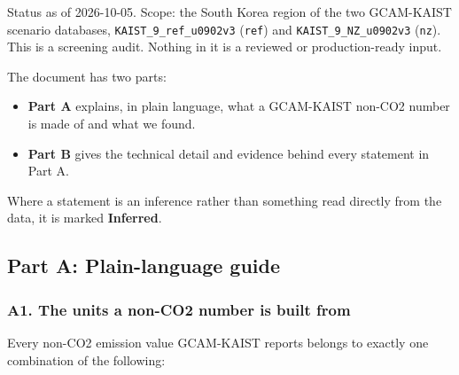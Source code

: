 Status as
of
2026-10-05.
Scope: the
South
Korea
region of
the two
GCAM-KAIST
scenario
databases,
\texttt{KAIST\_\allowbreak{}9\_\allowbreak{}ref\_\allowbreak{}u0902v3}
(\texttt{ref})
and
\texttt{KAIST\_\allowbreak{}9\_\allowbreak{}NZ\_\allowbreak{}u0902v3}
(\texttt{nz}).
This is a
screening
audit.
Nothing in
it is a
reviewed
or
production-ready
input.

The
document
has two
parts:

\begin{itemize}
\tightlist
\item
  \textbf{Part
  A}
  explains,
  in plain
  language,
  what a
  GCAM-KAIST
  non-CO2
  number
  is made
  of and
  what we
  found.
\item
  \textbf{Part
  B} gives
  the
  technical
  detail
  and
  evidence
  behind
  every
  statement
  in Part
  A.
\end{itemize}

Where a
statement
is an
inference
rather
than
something
read
directly
from the
data, it
is marked
\textbf{Inferred}.

\hypertarget{part-a-plain-language-guide}{%
\subsection{Part
A:
Plain-language
guide}\label{part-a-plain-language-guide}}

\hypertarget{a1.-the-units-a-non-co2-number-is-built-from}{%
\subsubsection{A1.
The units
a non-CO2
number is
built
from}\label{a1.-the-units-a-non-co2-number-is-built-from}}

Every
non-CO2
emission
value
GCAM-KAIST
reports
belongs to
exactly
one
combination
of the
following:

